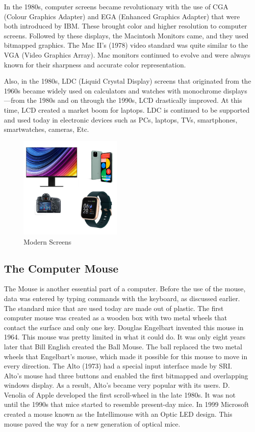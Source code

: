 \documentclass{article}
\begin{document}
In the 1980s, computer screens became revolutionary with the use of CGA (Colour Graphics Adapter) and EGA (Enhanced Graphics Adapter) that were both introduced by IBM. These brought color and higher resolution to computer screens. Followed by these displays, the Macintosh Monitors came, and they used bitmapped graphics. The Mac II’s (1978) video standard was quite similar to the VGA (Video Graphics Array). Mac monitors continued to evolve and were always known for their sharpness and accurate color representation.

Also, in the 1980s, LDC (Liquid Crystal Display) screens that originated from the 1960s became widely used on calculators and watches with monochrome displays—from the 1980s and on through the 1990s, LCD drastically improved. At this time, LCD created a market boom for laptops. LDC is continued to be supported and used today in electronic devices such as PCs, laptops, TVs, smartphones, smartwatches, cameras, Etc.
\cite{ref5}

\begin{figure}[!h]
    \caption{Modern Screens}
    \label{image:MODERNSCREENS}
    \centering
    \includegraphics[width=0.45\textwidth]{pics/modern_screens.png}
\end{figure}

\subsection{The Computer Mouse}
The Mouse is another essential part of a computer. Before the use of the mouse, data was entered by typing commands with the keyboard, as discussed earlier. The standard mice that are used today are made out of plastic. The first computer mouse was created as a wooden box with two metal wheels that contact the surface and only one key. Douglas Engelbart invented this mouse in 1964. This mouse was pretty limited in what it could do. It was only eight years later that Bill English created the Ball Mouse. The ball replaced the two metal wheels that Engelbart’s mouse, which made it possible for this mouse to move in every direction. The Alto (1973) had a special input interface made by SRI. Alto’s mouse had three buttons and enabled the first bitmapped and overlapping windows display. As a result, Alto’s became very popular with its users. D. Venolia of Apple developed the first scroll-wheel in the late 1980s. It was not until the 1990s that mice started to resemble present-day mice. In 1999 Microsoft created a mouse known as the Intellimouse with an Optic LED design. This mouse paved the way for a new generation of optical mice.
\cite{ref6} \cite{ref7}
\end{document}
